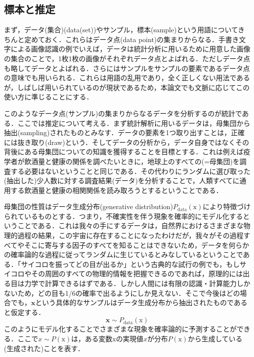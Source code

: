 \documentclass[a4paper,11pt]{jsreport}
\begin{document}
\subsection{標本と推定}
まず，データ(集合)(data(set))やサンプル，標本(sample)という用語についてきちんと定めておく．これらはデータ点(data point)の集まりからなる．手書き文字による画像認識の例でいえば，データは統計分析に用いるために用意した画像の集合のことで，1枚1枚の画像がそれぞれデータ点とよばれる．ただしデータ点も略してデータとよばれる．さらにはサンプルをサンプルの要素であるデータ点の意味でも用いられる．これらは用語の乱用であり，全く正しくない用法であるが，しばしば用いられているのが現状であるため，本論文でも文脈に応じてこの使い方に準じることにする．\par
このようなデータ点(サンプル)の集まりからなるデータを分析するのが統計である．ここでは推定について考える．まず統計解析に用いるデータは，母集団から抽出(sampling)されたものとみなす．データの要素を1つ取り出すことは，正確には抜き取り(draw)という．そしてデータの分析から，データ自身ではなくその背後にある母集団についての知識を獲得することを目標とする．これは例えば疫学者が飲酒量と健康の関係を調べたいときに，地球上のすべての(=母集団)を調査する必要はないということと同じである．その代わりにランダムに選び取った(抽出した)少人数に対する調査結果(データ)を分析することで，人類すべてに通用する飲酒量と健康の相関関係を読み取ろうとするということである．\par
母集団の性質はデータ生成分布(generative distribution)$P_{\text{data}}(\mathrm{x})$により特徴づけられているものとする．つまり，不確実性を伴う現象を確率的にモデル化するということである．これは我々の手にするデータは，自然界におけるさまざまな物理的過程の結果，この宇宙に存在することになったわけだが，我々がその過程すべてやそこに寄与する因子のすべてを知ることはできないため，データを何らかの確率論的な過程に従ってランダムに生じているとみなしているということである．「サイコロを振ってどの目が出るか」という古典的な試行の例でも，もしサイコロやその周囲のすべての物理的情報を把握できるのであれば，原理的には出る目は力学で計算できるはずである．しかし人間には有限の認識・計算能力しかないため，どの目も1/6の確率で出るようにしか見えない．そこで今後はどの場合でも，$\bm{x}$という具体的なサンプルはデータ生成分布から抽出されたものであると仮定する．
\begin{equation}
  \bm{x} \sim P_{\text{data}}(\mathrm{x})
\end{equation}
このようにモデル化することでさまざまな現象を確率論的に予測することができる．ここで$x \sim P(\mathrm{x})$は，ある変数$\mathrm{x}$の実現値$x$が分布$P(\mathrm{x})$から生成している(生成された)ことを表す．\par
\end{document}
